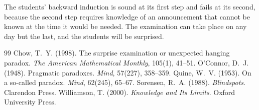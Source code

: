 \documentclass{situationist-preprint}
\begin{document}
The students' backward induction is sound at its first step and fails at its second, because the second step requires knowledge of an announcement that cannot be known at the time it would be needed. The examination can take place on any day but the last, and the students will be surprised.

\begin{thebibliography}{99}\small
{} Chow, T.~Y. (1998). The surprise examination or unexpected hanging paradox. \emph{The American Mathematical Monthly}, 105(1), 41--51.
 O'Connor, D.~J. (1948). Pragmatic paradoxes. \emph{Mind}, 57(227), 358--359.
 Quine, W.~V. (1953). On a so-called paradox. \emph{Mind}, 62(245), 65--67.
 Sorensen, R.~A. (1988). \emph{Blindspots}. Clarendon Press.
 Williamson, T. (2000). \emph{Knowledge and Its Limits}. Oxford University Press.
\end{thebibliography}
\end{document}
